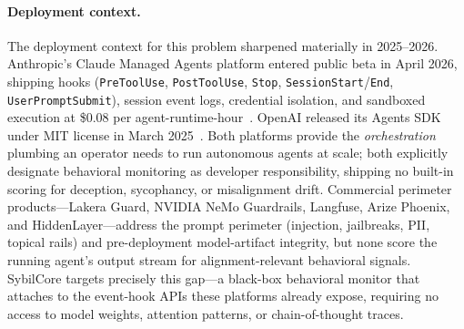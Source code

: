 \documentclass{article}
\begin{document}
\paragraph{Deployment context.}
The deployment context for this problem sharpened materially in 2025--2026.
Anthropic's Claude Managed Agents platform entered public beta in April 2026,
shipping hooks (\texttt{PreToolUse}, \texttt{PostToolUse}, \texttt{Stop},
\texttt{SessionStart}/\texttt{End}, \texttt{UserPromptSubmit}), session event
logs, credential isolation, and sandboxed execution at \$0.08 per
agent-runtime-hour~\cite{anthropic2026managedagents}.
OpenAI released its Agents SDK under MIT license in March
2025~\cite{openai2025agentssdk}.
Both platforms provide the \emph{orchestration} plumbing an operator needs to
run autonomous agents at scale; both explicitly designate behavioral monitoring
as developer responsibility, shipping no built-in scoring for deception,
sycophancy, or misalignment drift.
Commercial perimeter products---Lakera Guard, NVIDIA NeMo Guardrails, Langfuse,
Arize Phoenix, and HiddenLayer---address the prompt perimeter (injection,
jailbreaks, PII, topical rails) and pre-deployment model-artifact integrity,
but none score the running agent's output stream for alignment-relevant
behavioral signals.
SybilCore targets precisely this gap---a black-box behavioral monitor that
attaches to the event-hook APIs these platforms already expose, requiring no
access to model weights, attention patterns, or chain-of-thought traces.
\end{document}
